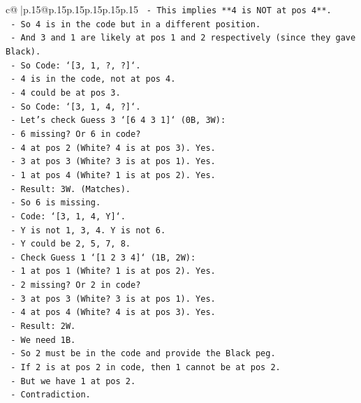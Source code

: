 \documentclass{article}
\begin{document}
{\begin{supertabular}{c@{$\;$}|p{.15\linewidth}@{}p{.15\linewidth}p{.15\linewidth}p{.15\linewidth}p{.15\linewidth}p{.15\linewidth}}
{{{\texttt{    {-} This implies **4 is NOT at pos 4**.} \\
\texttt{    {-} So 4 is in the code but in a different position.} \\
\texttt{    {-} And 3 and 1 are likely at pos 1 and 2 respectively (since they gave Black).} \\
\texttt{    {-} So Code: `{[}3, 1, ?, ?{]}`.} \\
\texttt{    {-} 4 is in the code, not at pos 4.} \\
\texttt{    {-} 4 could be at pos 3.} \\
\texttt{    {-} So Code: `{[}3, 1, 4, ?{]}`.} \\
\texttt{    {-} Let's check Guess 3 `{[}6 4 3 1{]}` (0B, 3W):} \\
\texttt{      {-} 6 missing? Or 6 in code?} \\
\texttt{      {-} 4 at pos 2 (White? 4 is at pos 3). Yes.} \\
\texttt{      {-} 3 at pos 3 (White? 3 is at pos 1). Yes.} \\
\texttt{      {-} 1 at pos 4 (White? 1 is at pos 2). Yes.} \\
\texttt{      {-} Result: 3W. (Matches).} \\
\texttt{    {-} So 6 is missing.} \\
\texttt{    {-} Code: `{[}3, 1, 4, Y{]}`.} \\
\texttt{    {-} Y is not 1, 3, 4. Y is not 6.} \\
\texttt{    {-} Y could be 2, 5, 7, 8.} \\
\texttt{    {-} Check Guess 1 `{[}1 2 3 4{]}` (1B, 2W):} \\
\texttt{      {-} 1 at pos 1 (White? 1 is at pos 2). Yes.} \\
\texttt{      {-} 2 missing? Or 2 in code?} \\
\texttt{      {-} 3 at pos 3 (White? 3 is at pos 1). Yes.} \\
\texttt{      {-} 4 at pos 4 (White? 4 is at pos 3). Yes.} \\
\texttt{      {-} Result: 2W.} \\
\texttt{      {-} We need 1B.} \\
\texttt{      {-} So 2 must be in the code and provide the Black peg.} \\
\texttt{      {-} If 2 is at pos 2 in code, then 1 cannot be at pos 2.} \\
\texttt{      {-} But we have 1 at pos 2.} \\
\texttt{      {-} Contradiction.} \\
}}}
\end{supertabular}}
\end{document}
